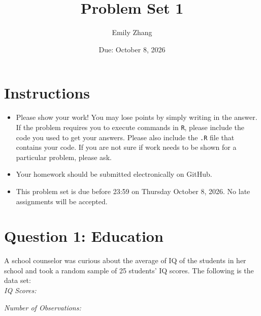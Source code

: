 \documentclass[12pt,letterpaper]{article}
\title{Problem Set 1}
\date{Due: October 8, 2026}
\author{Emily Zhang}
\begin{document}
	\maketitle
	
	\section*{Instructions}
	\begin{itemize}
		\item Please show your work! You may lose points by simply writing in the answer. If the problem requires you to execute commands in \texttt{R}, please include the code you used to get your answers. Please also include the \texttt{.R} file that contains your code. If you are not sure if work needs to be shown for a particular problem, please ask.
		\item Your homework should be submitted electronically on GitHub.
		\item This problem set is due before 23:59 on Thursday October 8, 2026. No late assignments will be accepted.
	\end{itemize}
	
	\vspace{1cm}
	\section*{Question 1: Education}
	
	A school counselor was curious about the average of IQ of the students in her school and took a random sample of 25 students' IQ scores. The following is the data set:\\
	
	\textit{IQ Scores:}
	
	
	\textit{Number of Observations:}
	
	
\end{document}
